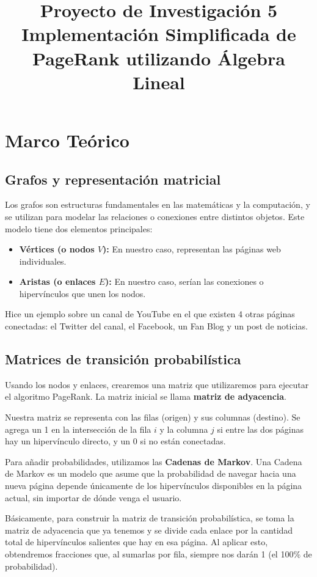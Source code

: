 \documentclass[12pt,letterpaper]{article}
\title{Proyecto de Investigación 5 \\ \textbf{Implementación Simplificada de PageRank utilizando Álgebra Lineal}}
\begin{document}
\maketitle
\newpage

\section{Marco Teórico}

\subsection{Grafos y representación matricial}
Los grafos son estructuras fundamentales en las matemáticas y la computación, y se utilizan para modelar las relaciones o conexiones entre distintos objetos. Este modelo tiene dos elementos principales:
\begin{itemize}
    \item \textbf{Vértices (o nodos $V$):} En nuestro caso, representan las páginas web individuales.
    \item \textbf{Aristas (o enlaces $E$):} En nuestro caso, serían las conexiones o hipervínculos que unen los nodos.
\end{itemize}

Hice un ejemplo sobre un canal de YouTube en el que existen 4 otras páginas conectadas: el Twitter del canal, el Facebook, un Fan Blog y un post de noticias.

\subsection{Matrices de transición probabilística}
Usando los nodos y enlaces, crearemos una matriz que utilizaremos para ejecutar el algoritmo PageRank. La matriz inicial se llama \textbf{matriz de adyacencia}.

Nuestra matriz se representa con las filas (origen) y sus columnas (destino). Se agrega un 1 en la intersección de la fila $i$ y la columna $j$ si entre las dos páginas hay un hipervínculo directo, y un 0 si no están conectadas.

Para añadir probabilidades, utilizamos las \textbf{Cadenas de Markov}. Una Cadena de Markov es un modelo que asume que la probabilidad de navegar hacia una nueva página depende únicamente de los hipervínculos disponibles en la página actual, sin importar de dónde venga el usuario.

Básicamente, para construir la matriz de transición probabilística, se toma la matriz de adyacencia que ya tenemos y se divide cada enlace por la cantidad total de hipervínculos salientes que hay en esa página. Al aplicar esto, obtendremos fracciones que, al sumarlas por fila, siempre nos darán 1 (el 100\% de probabilidad).
\end{document}
